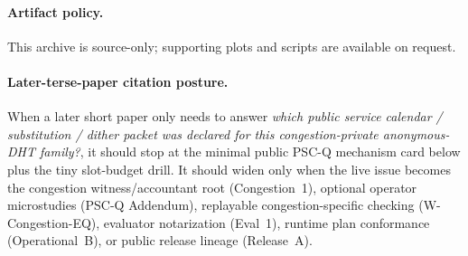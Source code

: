 \documentclass[11pt]{article}
\theoremstyle{definition}
\theoremstyle{remark}
\begin{document}
\paragraph{Artifact policy.}
This archive is source-only; supporting plots and scripts are available on request.\cite{series:artifactpolicy}

\paragraph{Later-terse-paper citation posture.}
When a later short paper only needs to answer \emph{which public service calendar / substitution / dither packet was declared for this congestion-private anonymous-DHT family?}, it should stop at the minimal public PSC-Q mechanism card below plus the tiny slot-budget drill.
It should widen only when the live issue becomes the congestion witness/accountant root (Congestion~1), optional operator microstudies (PSC-Q Addendum), replayable congestion-specific checking (W-Congestion-EQ), evaluator notarization (Eval~1), runtime plan conformance (Operational~B), or public release lineage (Release~A).\cite{series:congeq,series:pscqaddendum,series:wcongeq,series:evalnotary,series:opb,anondht_release_receipts}
\end{document}
